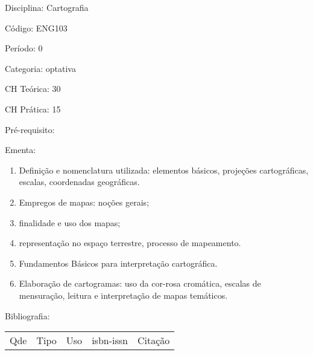 \documentclass[12pt,a4paper,twoside]{report}
\begin{document}
Disciplina: Cartografia

Código: ENG103

Período: 0

Categoria: optativa

CH Teórica: 30

CH Prática: 15




Pré-requisito:
\begin{enumerate}
\end{enumerate}

Ementa:
\begin{enumerate}
\item Definição e nomenclatura utilizada: elementos básicos, projeções cartográficas, escalas, coordenadas geográficas.
\item Empregos de mapas: noções gerais;
\item finalidade e uso dos mapas;
\item representação no espaço terrestre, processo de mapeamento.
\item Fundamentos Básicos para interpretação cartográfica.
\item Elaboração de cartogramas: uso da cor-rosa cromática, escalas de mensuração, leitura e interpretação de mapas temáticos.
\end{enumerate}



Bibliografia:


\begin{tabular}{llllp{8cm}}
Qde & Tipo & Uso & isbn-issn & Citação \\
\end{tabular}
\end{document}
